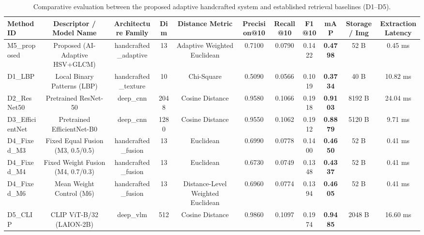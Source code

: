 \begin{table}[!t]
\centering
\caption{Comparative evaluation between the proposed adaptive handcrafted system and established retrieval baselines (D1--D5).}
\label{tab:deep_baselines}
\begin{tabular}{lcccccccccc}
\toprule
\textbf{Method ID} & \textbf{Descriptor / Model Name} & \textbf{Architecture Family} & \textbf{Dim} & \textbf{Distance Metric} & \textbf{Precision@10} & \textbf{Recall@10} & \textbf{F1@10} & \textbf{mAP} & \textbf{Storage / Img} & \textbf{Extraction Latency} \\
\midrule
M5_proposed & Proposed (AI-Adaptive HSV+GLCM) & handcrafted_adaptive & 13 & Adaptive Weighted Euclidean & 0.7100 & 0.0790 & 0.1422 & \textbf{0.4798} & 52 B & 0.45 ms \\
D1_LBP & Local Binary Patterns (LBP) & handcrafted_texture & 10 & Chi-Square & 0.5090 & 0.0566 & 0.1019 & \textbf{0.3734} & 40 B & 10.82 ms \\
D2_ResNet50 & Pretrained ResNet-50 & deep_cnn & 2048 & Cosine Distance & 0.9580 & 0.1066 & 0.1918 & \textbf{0.9103} & 8192 B & 24.04 ms \\
D3_EfficientNet & Pretrained EfficientNet-B0 & deep_cnn & 1280 & Cosine Distance & 0.9550 & 0.1062 & 0.1912 & \textbf{0.8879} & 5120 B & 9.71 ms \\
D4_Fixed_M3 & Fixed Equal Fusion (M3, 0.5/0.5) & handcrafted_fusion & 13 & Euclidean & 0.6990 & 0.0778 & 0.1400 & \textbf{0.4650} & 52 B & 0.41 ms \\
D4_Fixed_M4 & Fixed Weight Fusion (M4, 0.7/0.3) & handcrafted_fusion & 13 & Euclidean & 0.6730 & 0.0749 & 0.1348 & \textbf{0.4337} & 52 B & 0.41 ms \\
D4_Fixed_M6 & Mean Weight Control (M6) & handcrafted_fusion & 13 & Distance-Level Weighted Euclidean & 0.6960 & 0.0774 & 0.1394 & \textbf{0.4605} & 52 B & 0.41 ms \\
D5_CLIP & CLIP ViT-B/32 (LAION-2B) & deep_vlm & 512 & Cosine Distance & 0.9860 & 0.1097 & 0.1974 & \textbf{0.9485} & 2048 B & 16.60 ms \\
\bottomrule
\end{tabular}
\end{table}